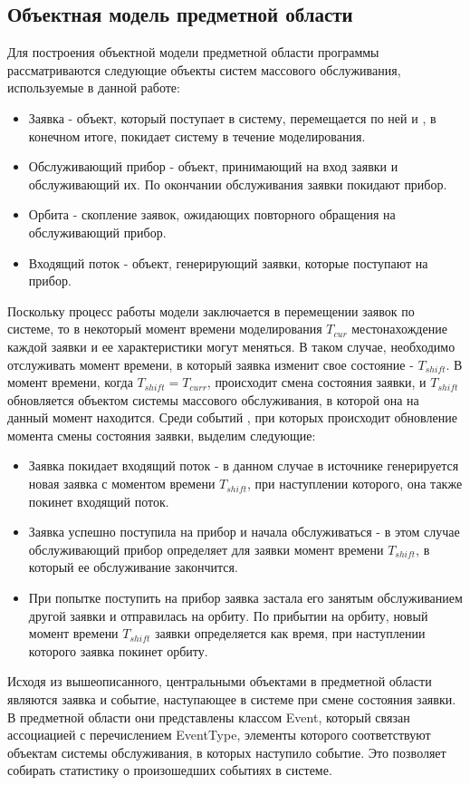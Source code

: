 \subsection {Объектная модель предметной области}
Для построения объектной модели предметной области программы рассматриваются следующие объекты систем массового обслуживания, используемые в данной работе:
\begin{itemize}
\item Заявка - объект, который поступает в систему, перемещается по ней и , в конечном итоге, покидает систему в течение моделирования.
\item Обслуживающий прибор - объект, принимающий на вход заявки и обслуживающий их. По окончании обслуживания заявки покидают прибор.
\item Орбита - скопление заявок, ожидающих повторного обращения на обслуживающий прибор.
\item Входящий поток - объект, генерирующий заявки, которые поступают на прибор.
	\end{itemize}
 Поскольку процесс работы модели заключается в перемещении заявок по системе, то в некоторый момент времени моделирования $T_{cur}$ местонахождение каждой заявки и ее характеристики могут меняться. В таком случае, необходимо отслуживать момент времени, в который заявка изменит свое состояние - $T_{shift}$. В момент времени, когда $T_{shift} = T_{curr}$,  происходит смена состояния заявки, и  $T_{shift}$ обновляется объектом системы массового обслуживания, в которой она на данный момент находится. Среди событий , при которых происходит обновление момента смены состояния заявки, выделим следующие:
\begin{itemize}
	\item Заявка покидает входящий поток - в данном случае в источнике генерируется новая заявка с моментом времени $T_{shift}$, при наступлении которого, она также покинет входящий поток.
	\item Заявка успешно поступила на прибор и начала обслуживаться - в этом случае обслуживающий прибор определяет для заявки момент времени $T_{shift}$, в который ее обслуживание закончится.
	\item При попытке поступить на прибор заявка застала его занятым обслуживанием другой заявки и отправилась на орбиту. По прибытии на орбиту, новый момент времени $T_{shift}$ заявки определяется как время, при наступлении которого заявка покинет орбиту.
\end{itemize}
Исходя из вышеописанного, центральными объектами в предметной области являются заявка и событие, наступающее в системе при смене состояния заявки. В предметной области они представлены классом Event, который связан ассоциацией с перечислением EventType, элементы которого соответствуют объектам системы обслуживания, в которых наступило  событие. Это позволяет собирать статистику о произошедших событиях в системе.
